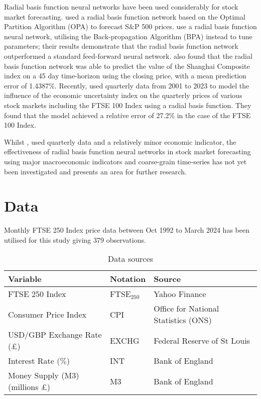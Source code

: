 \documentclass[11pt,a4paper]{article}
\newcommand{\citeboth}[1]{\citeauthor{#1} \citep{#1}}
\begin{document}
Radial basis function neural networks have been used considerably for stock market forecasting. \citeboth{cao2004} 
used a radial basis function network based on the Optimal Partition Algorithm (OPA) to 
forecast S$\&$P 500 prices. \citeboth{dass2019} use a radial basis function neural network, utilising the Back-propagation 
Algorithm (BPA) instead to tune parameters; their results demonstrate 
that the radial basis function network outperformed a standard feed-forward neural network. 
\citeboth{ji2014} also found that the radial basis function network was able to predict the value 
of the Shanghai Composite index on a 45 day time-horizon using the closing price, with a mean prediction error of 
1.4387$\%$. Recently, \citeboth{abotaleb2024}
used quarterly data from 2001 to 2023 to model the influence of the economic 
uncertainty index on the quarterly prices of various stock markets including the 
FTSE 100 Index using a radial basis function. They found that the model 
achieved a relative error of 27.2$\%$ in the case of the FTSE 100 Index.

Whilst \citeboth{abotaleb2024}, used quarterly data and a relatively minor economic indicator, the effectiveness of radial basis function neural networks in stock market forecasting using 
major macroeconomic indicators and coarse-grain time-series has not yet been investigated and presents an area for further 
research. 

\section{Data}

Monthly FTSE 250 Index price data between Oct 1992 to March 2024 has been utilised for this study giving 379 observations.


\begin{table}[h!]
    \centering
    \caption{Data sources}
    \begin{tabular}{lll}
        \toprule
        \textbf{Variable} & \textbf{Notation} & \textbf{Source} \\
        \midrule
        FTSE 250 Index & FTSE$_{250}$ & Yahoo Finance \\
        Consumer Price Index & CPI & Office for National Statistics (ONS) \\
        USD/GBP Exchange Rate (£) & EXCHG & Federal Reserve of St Louis \\
        Interest Rate ($\%$) & INT & Bank of England \\
        Money Supply (M3) (millions £) & M3 & Bank of England \\
        \bottomrule
    \end{tabular}
\end{table}
\end{document}
